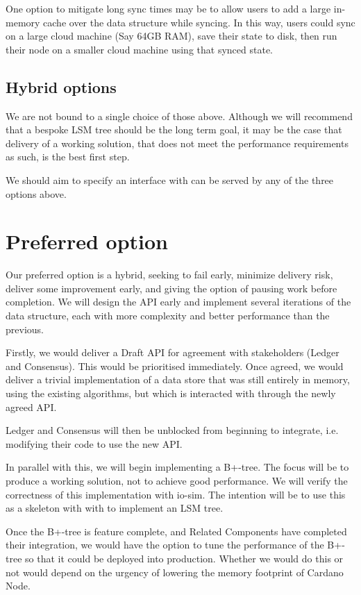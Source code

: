 \documentclass[11pt,a4paper]{article}
\begin{document}
One option to mitigate long sync times may be to allow users to add a large
in-memory cache over the data structure while syncing. In this way, users could
sync on a large cloud machine (Say 64GB RAM), save their state to disk, then run
their node on a smaller cloud machine using that synced state.


\subsection{Hybrid options}

We are not bound to a single choice of those above. Although we will recommend that
a bespoke LSM tree should be the long term goal, it may be the case that delivery of a
working solution, that does not meet the performance requirements as such, is
the best first step.

We should aim to specify an interface with can be served by any of the three
options above.

\section{Preferred option}
\label{preferred}

Our preferred option is a hybrid, seeking to fail early, minimize delivery risk,
deliver some improvement early, and giving the option of pausing work before
completion. We will design the API early and implement several iterations of the
data structure, each with more complexity and better performance than the
previous.

Firstly, we would deliver a Draft API for agreement with stakeholders (Ledger
and Consensus). This would be prioritised immediately. Once agreed, we would
deliver a trivial implementation of a data store that was still entirely in
memory, using the existing algorithms, but which is interacted with through the
newly agreed API.

Ledger and Consensus will then be unblocked from beginning to integrate, i.e.
modifying their code to use the new API.

In parallel with this, we will begin implementing a B+-tree. The focus will
be to produce a working solution, not to achieve good performance. We
will verify the correctness of this implementation with io-sim. The intention
will be to use this as a skeleton with with to implement an LSM tree.

Once the B+-tree is feature complete, and Related Components have completed
their integration, we would have the option to tune the performance of the
B+-tree so that it could be deployed into production. Whether we would do this
or not would depend on the urgency of lowering the memory footprint of Cardano
Node.
\end{document}
